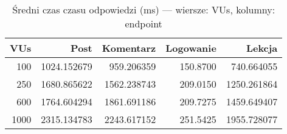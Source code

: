 \begin{table}[H]
\centering
\caption{Średni czas czasu odpowiedzi (ms) — wiersze: VUs, kolumny: endpoint}
\label{tab:srednia-vs-vus}
\begin{tabular}{rrrrr}
\toprule
 VUs &        Post &   Komentarz &  Logowanie &      Lekcja \\
\midrule
 100 & 1024.152679 &  959.206359 &   150.8700 &  740.664055 \\
 250 & 1680.865622 & 1562.238743 &   209.0150 & 1250.261864 \\
 600 & 1764.604294 & 1861.691186 &   209.7275 & 1459.649407 \\
1000 & 2315.134783 & 2243.617152 &   251.5425 & 1955.728077 \\
\bottomrule
\end{tabular}
\end{table}
